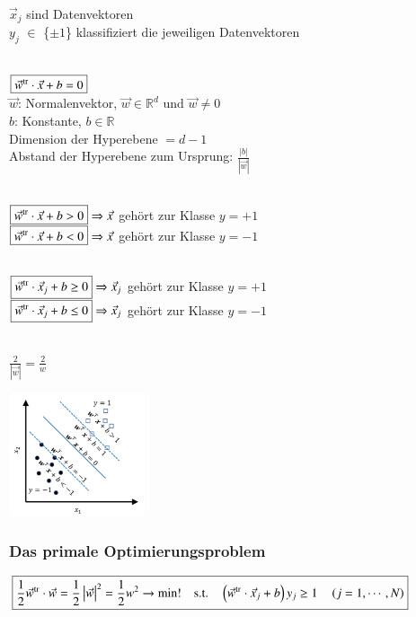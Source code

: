 $\vec{x}_j$ sind Datenvektoren\\
$y_j$ $\in $ \{$\pm 1$\} klassifiziert die jeweiligen Datenvektoren
\newline
\begin{minipage}[]{0.56\columnwidth}
    \\
    $\boxed{\vec{w}^{\operatorname{tr}}\cdot\vec{x}+b=0}$ \\
    $\vec{w}$: Normalenvektor, $\vec{w} \in \mathbb{R}^d$ und $\vec{w} \neq 0$\\
    $b$: Konstante, $b \in \mathbb{R}$\\
    Dimension der Hyperebene $= d-1$\\
    Abstand der Hyperebene zum Ursprung: $\frac{\left\lvert b \right\rvert }{\left\lvert \vec{w}\right\rvert }$
    \medskip

    \\
    $\boxed{\vec{w}^{\operatorname{tr}}\cdot\vec{x}+b>0} \Rightarrow \vec{x} $ gehört zur Klasse $y = +1$\\
    $\boxed{\vec{w}^{\operatorname{tr}}\cdot\vec{x}+b<0} \Rightarrow \vec{x} $ gehört zur Klasse $y = -1$
    \medskip

    \\
    $\boxed{\vec{w}^{\operatorname{tr}}\cdot\vec{x}_j+b \geq 0} \Rightarrow \vec{x}_j $ gehört zur Klasse $y = +1$\\
    $\boxed{\vec{w}^{\operatorname{tr}}\cdot\vec{x}_j+b\leq 0} \Rightarrow \vec{x}_j $ gehört zur Klasse $y = -1$
    \medskip

    \\
    $\boxed{\frac{2}{\left\lvert \vec{w}\right\rvert }=\frac{2}{w}}$
\end{minipage}\hfill
\begin{minipage}[t]{0.4\columnwidth}
    \includegraphics[width=4cm]{images/7_model_values.png}
\end{minipage}

\subsubsection{Das primale Optimierungsproblem}
$\boxed{\frac12\vec{w}^{\operatorname{tr}}\cdot\vec{w}=\frac12\left|\vec{w}\right|^2=\frac12w^2\to\min!\quad\mathrm{s.t.}\quad\left(\vec{w}^{\operatorname{tr}}\cdot\vec{x}_j+b\right)y_j\geq1\quad\left(j=1,\cdots,N\right)}$

